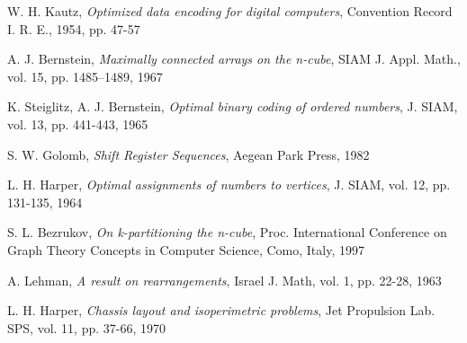 \documentclass[12pt, a4paper]{article}
\begin{document}
\begin{thebibliography}{99}
\label{Bibliography}

	W. H. Kautz,
	\emph{Optimized data encoding for digital computers},
	Convention Record I. R. E., 1954, pp. 47-57

	A. J. Bernstein,
	\emph{Maximally connected arrays on the n-cube},
	SIAM J. Appl. Math., vol. 15, pp. 1485–1489, 1967

	K. Steiglitz, A. J. Bernstein,
	\emph{Optimal binary coding of ordered numbers},
	J. SIAM, vol. 13, pp. 441-443, 1965

	S. W. Golomb,
	\emph{Shift Register Sequences},
	Aegean Park Press, 1982

	L. H. Harper,
	\emph{Optimal assignments of numbers to vertices},
	J. SIAM, vol. 12, pp. 131-135, 1964

	S. L. Bezrukov,
	\emph{On k-partitioning the n-cube},
	Proc. International Conference on Graph Theory Concepts in Computer Science,
	Como, Italy, 1997

	A. Lehman,
	\emph{A result on rearrangements},
	Israel J. Math, vol. 1, pp. 22-28, 1963

	L. H. Harper,
	\emph{Chassis layout and isoperimetric problems},
	Jet Propulsion Lab. SPS, vol. 11, pp. 37-66, 1970

\end{thebibliography}
\end{document}
